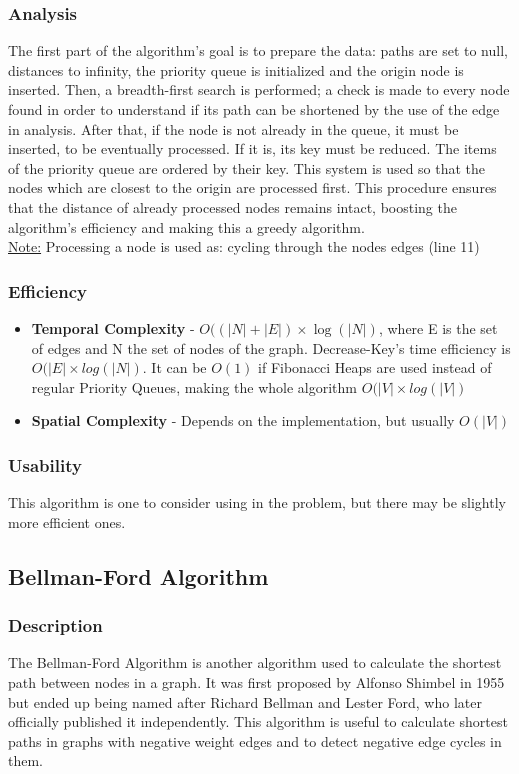 \subsubsection{Analysis}
The first part of the algorithm's goal is to prepare the data: paths are set to null, distances to infinity, the priority queue is initialized and the origin node is inserted. Then, a breadth-first search is performed; a check is made to every node found in order to understand if its path can be shortened by the use of the edge in analysis. After that, if the node is not already in the queue, it must be inserted, to be eventually processed. If it is, its key must be reduced. The items of the priority queue are ordered by their key. This system is used so that the nodes which are closest to the origin are processed first. This procedure ensures that the distance of already processed nodes remains intact, boosting the algorithm's efficiency and making this a greedy algorithm. \\
\uline{Note:} Processing a node is used as: cycling through the nodes edges (line 11)

\subsubsection{Efficiency}
\begin{itemize}
    \item \textbf{Temporal Complexity} - $ O((|N|+|E|) \times \log(|N|) $, where E is the set of edges and N the set of nodes of the graph. Decrease-Key's time efficiency is $ O(|E| \times log(|N|)$. It can be $ O(1) $ if Fibonacci Heaps are used instead of regular Priority Queues, making the whole algorithm $ O(|V| \times log(|V|) $ 
    \item \textbf{Spatial Complexity} - Depends on the implementation, but usually $ O(|V|) $
\end{itemize}

\subsubsection{Usability}
This algorithm is one to consider using in the problem, but there may be slightly more efficient ones.


\subsection{Bellman-Ford Algorithm}

\subsubsection{Description}
The Bellman-Ford Algorithm is another algorithm used to calculate the shortest path between nodes in a graph. It was first proposed by Alfonso Shimbel in 1955 but ended up being named after Richard Bellman and Lester Ford, who later officially published it independently. This algorithm is useful to calculate shortest paths in graphs with negative weight edges and to detect negative edge cycles in them.

